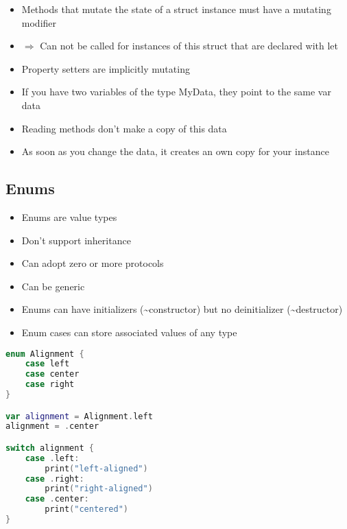 \begin{breakbox}

\begin{itemize}
\tightlist
\item
  Methods that mutate the state of a struct instance must have a
  mutating modifier
\item
  $\Rightarrow$ Can not be called for instances of this struct that are declared
  with let
\item
  Property setters are implicitly mutating
\end{itemize}
\end{breakbox}

\begin{breakbox}
\begin{itemize}
\tightlist
\item
  If you have two variables of the type MyData, they point to the same
  var data
\item
  Reading methods don't make a copy of this data
\item
  As soon as you change the data, it creates an own copy for your
  instance
\end{itemize}

\end{breakbox}

\subsection{Enums}

\begin{breakbox}

\begin{itemize}
\tightlist
\item
  Enums are value types
\item
  Don't support inheritance
\item
  Can adopt zero or more protocols
\item
  Can be generic
\item
  Enums can have initializers (\textasciitilde{}constructor) but no
  deinitializer (\textasciitilde{}destructor)
\item
  Enum cases can store associated values of any type
\end{itemize}

\begin{lstlisting}[language=swift]
enum Alignment {
    case left
    case center
    case right
}

var alignment = Alignment.left
alignment = .center

switch alignment {
    case .left:
        print("left-aligned")
    case .right:
        print("right-aligned")
    case .center:
        print("centered")
}
\end{lstlisting}
\end{breakbox}

